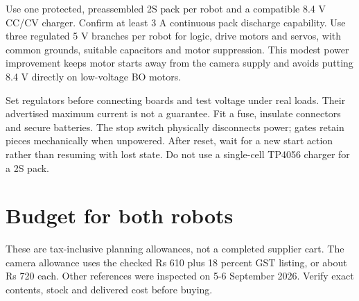 \documentclass[10pt,a4paper]{article}
\begin{document}
Use one protected, preassembled 2S pack per robot and a compatible 8.4 V CC/CV charger. Confirm at least 3 A continuous pack discharge capability. Use three regulated 5 V branches per robot for logic, drive motors and servos, with common grounds, suitable capacitors and motor suppression. This modest power improvement keeps motor starts away from the camera supply and avoids putting 8.4 V directly on low-voltage BO motors.

Set regulators before connecting boards and test voltage under real loads. Their advertised maximum current is not a guarantee. Fit a fuse, insulate connectors and secure batteries. The stop switch physically disconnects power; gates retain pieces mechanically when unpowered. After reset, wait for a new start action rather than resuming with lost state. Do not use a single-cell TP4056 charger for a 2S pack.

\section{Budget for both robots}
These are tax-inclusive planning allowances, not a completed supplier cart. The camera allowance uses the checked Rs 610 plus 18 percent GST listing, or about Rs 720 each. Other references were inspected on 5-6 September 2026. Verify exact contents, stock and delivered cost before buying.
\end{document}
